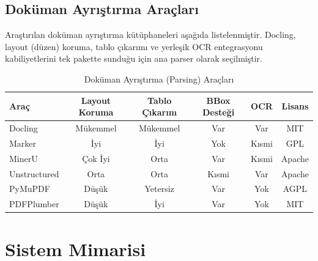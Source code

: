\documentclass[11pt,a4paper]{article}
\begin{document}
\subsection{Doküman Ayrıştırma Araçları}
Araştırılan doküman ayrıştırma kütüphaneleri aşağıda listelenmiştir. Docling, layout (düzen) koruma, tablo çıkarımı ve yerleşik OCR entegrasyonu kabiliyetlerini tek pakette sunduğu için ana parser olarak seçilmiştir.

\begin{table}[H]
\centering
\caption{Doküman Ayrıştırma (Parsing) Araçları}
\begin{tabular}{lccccc}
\toprule
Araç & Layout Koruma & Tablo Çıkarım & BBox Desteği & OCR & Lisans \\
\midrule
Docling & Mükemmel & Mükemmel & Var & Var & MIT \\
Marker & İyi & İyi & Yok & Kısmi & GPL \\
MinerU & Çok İyi & Orta & Var & Kısmi & Apache \\
Unstructured & Orta & Orta & Kısmi & Var & Apache \\
PyMuPDF & Düşük & Yetersiz & Var & Yok & AGPL \\
PDFPlumber & Düşük & İyi & Var & Yok & MIT \\
\bottomrule
\end{tabular}
\end{table}

\section{Sistem Mimarisi}
\end{document}
